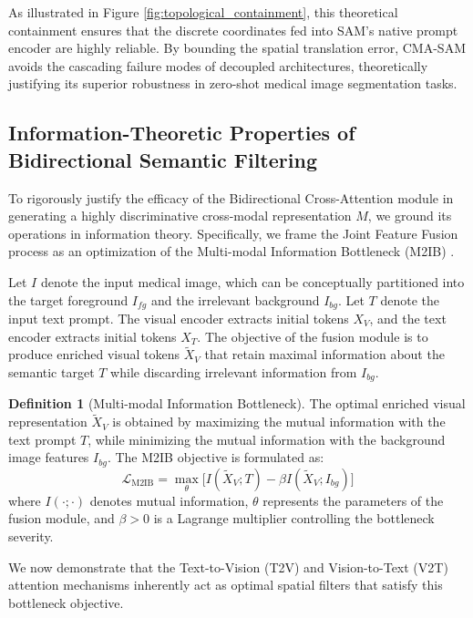 \documentclass[onecolumn]{IEEEtran}
\numberwithin{equation}{section}
\theoremstyle{definition}
\newtheorem{definition}[theorem]{Definition}
\theoremstyle{remark}
\begin{document}
As illustrated in Figure \ref{fig:topological_containment}, this theoretical containment ensures that the discrete coordinates fed into SAM's native prompt encoder are highly reliable. By bounding the spatial translation error, CMA-SAM avoids the cascading failure modes of decoupled architectures, theoretically justifying its superior robustness in zero-shot medical image segmentation tasks.

\subsection{Information-Theoretic Properties of Bidirectional Semantic Filtering}

To rigorously justify the efficacy of the Bidirectional Cross-Attention module in generating a highly discriminative cross-modal representation $M$, we ground its operations in information theory. Specifically, we frame the Joint Feature Fusion process as an optimization of the Multi-modal Information Bottleneck (M2IB) \cite{wang2023visual}.

Let $I$ denote the input medical image, which can be conceptually partitioned into the target foreground $I_{fg}$ and the irrelevant background $I_{bg}$. Let $T$ denote the input text prompt. The visual encoder extracts initial tokens $X_V$, and the text encoder extracts initial tokens $X_T$. The objective of the fusion module is to produce enriched visual tokens $\tilde{X}_V$ that retain maximal information about the semantic target $T$ while discarding irrelevant information from $I_{bg}$.

\begin{definition}[Multi-modal Information Bottleneck]
The optimal enriched visual representation $\tilde{X}_V$ is obtained by maximizing the mutual information with the text prompt $T$, while minimizing the mutual information with the background image features $I_{bg}$. The M2IB objective is formulated as:
\begin{equation}
    \mathcal{L}_{\text{M2IB}} = \max_{\theta} \Big[ I(\tilde{X}_V; T) - \beta I(\tilde{X}_V; I_{bg}) \Big]
\end{equation}
where $I(\cdot ; \cdot)$ denotes mutual information, $\theta$ represents the parameters of the fusion module, and $\beta > 0$ is a Lagrange multiplier controlling the bottleneck severity.
\end{definition}

We now demonstrate that the Text-to-Vision (T2V) and Vision-to-Text (V2T) attention mechanisms \cite{wang2024sam} inherently act as optimal spatial filters that satisfy this bottleneck objective.
\end{document}
